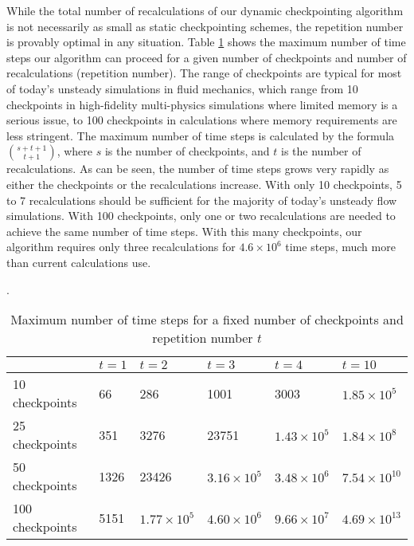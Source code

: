 \documentclass[oneeqnum, onethmnum, onefignum, onetabnum]{siamltex}
\begin{document}
While the total number of recalculations of our dynamic checkpointing
algorithm is not necessarily as small as static checkpointing schemes, the
repetition number is provably optimal in any situation.
Table \ref{tab1} shows the maximum number of time steps our algorithm can
proceed for a
given number of checkpoints and number of recalculations (repetition number).
The range of
checkpoints are typical for most of today's unsteady simulations in fluid
mechanics, which range from 10 checkpoints in high-fidelity multi-physics
simulations where limited memory is a serious issue, to 100 checkpoints in
calculations where memory requirements are less stringent.  The maximum number
of time steps is calculated by the formula $\binom{s + t+1}{t+1}$,
where $s$ is the number of checkpoints, and $t$ is the number of
recalculations.
As can be seen, the number of time steps grows very rapidly as either
the checkpoints or the recalculations increase.  With only 10 checkpoints,
5 to 7 recalculations should be sufficient for the majority of today's unsteady
flow simulations.  With 100 checkpoints, only one or two recalculations are
needed to achieve the same number of time steps.  With this many checkpoints,
our algorithm requires only three recalculations for $4.6 \times 10^6$ time
steps, much more than current calculations use.
\begin{table}[htp] \center
\label{tab1}
\caption{Maximum number of time steps for a fixed number of checkpoints and
         repetition number $t$}.
\begin{tabular}{llllll}
\\
\hline
& $t=1$ & $t=2$ & $t=3$ & $t=4$ & $t=10$ \\
\hline
10 checkpoints & 66  & 286  & 1001  & 3003 & $1.85 \times 10^5$ \\
25 checkpoints & 351 & 3276 & 23751 & $1.43 \times 10^5$ &
                 $1.84 \times 10^8$ \\
50 checkpoints & 1326 & 23426 & $3.16 \times 10^5$ & $3.48 \times 10^6$ &
                 $7.54 \times 10^{10}$ \\
100 checkpoints & 5151 & $1.77 \times 10^5$ & $4.60 \times 10^6$ & 
                  $9.66 \times 10^7$ & $4.69 \times 10^{13}$ \\
\hline
\end{tabular}
\end{table}
\end{document}
